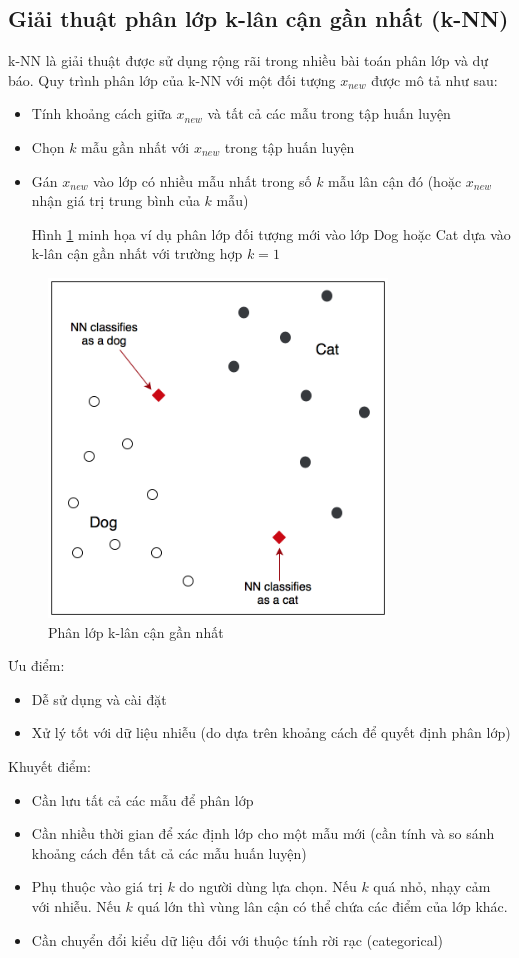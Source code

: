 \documentclass[13pt,oneside]{scrbook}
\begin{document}
\subsection{Giải thuật phân lớp k-lân cận gần nhất (k-NN)}
k-NN là giải thuật được sử dụng rộng rãi trong nhiều bài toán phân lớp và dự báo.
Quy trình phân lớp của k-NN với một đối tượng $x_{new}$ được mô tả như sau:
\begin{itemize}
\item Tính khoảng cách giữa $x_{new}$ và tất cả các mẫu trong tập huấn luyện 
\item Chọn $k$ mẫu gần nhất với $x_{new}$ trong tập huấn luyện
\item Gán $x_{new}$ vào lớp có nhiều mẫu nhất trong số $k$ mẫu lân cận đó (hoặc $x_{new}$ nhận giá trị trung bình của $k$ mẫu)

Hình \ref{K-NN_Example.png} minh họa ví dụ phân lớp đối tượng mới vào lớp Dog hoặc Cat dựa vào k-lân cận gần nhất với trường hợp $k=1$
\end{itemize}
\begin{figure}[h!]
	\begin{center}
		\includegraphics[width=90mm]{K-NN_Example.png}
		\caption{Phân lớp k-lân cận gần nhất}
		\label{K-NN_Example.png}
	\end{center}
\end{figure}
Ưu điểm:
\begin{itemize}
\item Dễ sử dụng và cài đặt
\item Xử lý tốt với dữ liệu nhiễu (do dựa trên khoảng cách để quyết định phân lớp)
\end{itemize}
Khuyết điểm:
\begin{itemize}
\item Cần lưu tất cả các mẫu để phân lớp
\item Cần nhiều thời gian để xác định lớp cho một mẫu mới (cần tính và so sánh khoảng cách đến tất cả các mẫu huấn luyện)
\item Phụ thuộc vào giá trị $k$ do người dùng lựa chọn. Nếu $k$ quá nhỏ, nhạy cảm với nhiễu. 
Nếu $k$ quá lớn thì vùng lân cận có thể chứa các điểm của lớp khác.
\item Cần chuyển đổi kiểu dữ liệu đối với thuộc tính rời rạc (categorical)
\end{itemize}
\end{document}
